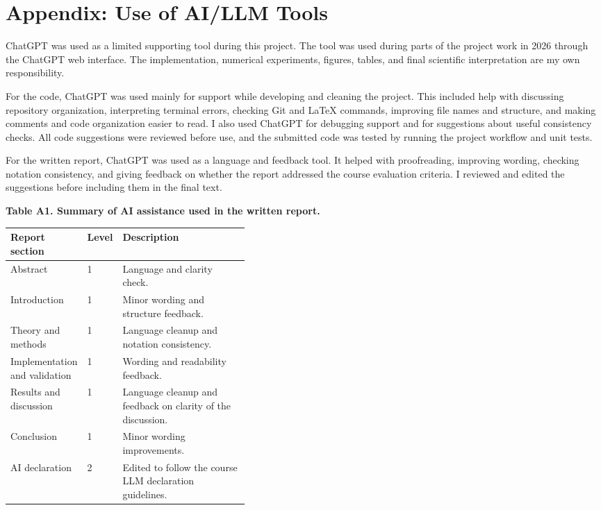 
\section*{Appendix: Use of AI/LLM Tools}

ChatGPT was used as a limited supporting tool during this project. The tool was used during parts of the project work in 2026 through the ChatGPT web interface. The implementation, numerical experiments, figures, tables, and final scientific interpretation are my own responsibility.

For the code, ChatGPT was used mainly for support while developing and cleaning the project. This included help with discussing repository organization, interpreting terminal errors, checking Git and \LaTeX{} commands, improving file names and structure, and making comments and code organization easier to read. I also used ChatGPT for debugging support and for suggestions about useful consistency checks. All code suggestions were reviewed before use, and the submitted code was tested by running the project workflow and unit tests.

For the written report, ChatGPT was used as a language and feedback tool. It helped with proofreading, improving wording, checking notation consistency, and giving feedback on whether the report addressed the course evaluation criteria. I reviewed and edited the suggestions before including them in the final text.

\noindent\textbf{Table A1. Summary of AI assistance used in the written report.}

\begin{center}
\setlength{\tabcolsep}{3pt}
\renewcommand{\arraystretch}{1.12}
\begin{tabularx}{\linewidth}{@{}p{0.30\linewidth}p{0.10\linewidth}X@{}}
\hline
\textbf{Report section} & \textbf{Level} & \textbf{Description} \\
\hline
Abstract & 1 & Language and clarity check. \\
Introduction & 1 & Minor wording and structure feedback. \\
Theory and methods & 1 & Language cleanup and notation consistency. \\
Implementation and validation & 1 & Wording and readability feedback. \\
Results and discussion & 1 & Language cleanup and feedback on clarity of the discussion. \\
Conclusion & 1 & Minor wording improvements. \\
AI declaration & 2 & Edited to follow the course LLM declaration guidelines. \\
\hline
\end{tabularx}
\end{center}

